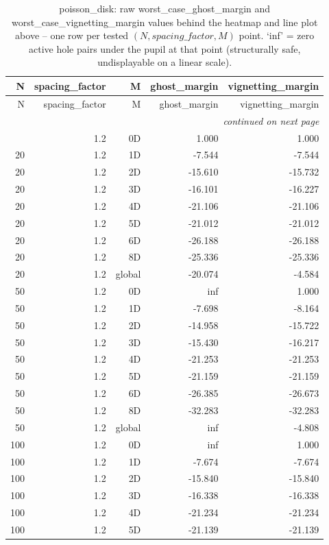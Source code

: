 \begin{longtable}{rrrrr}
\caption{poisson\_disk: raw worst\_case\_ghost\_margin and worst\_case\_vignetting\_margin values behind the heatmap and line plot above -- one row per tested $(N, spacing\_factor, M)$ point. `inf' = zero active hole pairs under the pupil at that point (structurally safe, undisplayable on a linear scale).} \\
\toprule
N & spacing\_factor & M & ghost\_margin & vignetting\_margin \\
\midrule
\endfirsthead
\toprule
N & spacing\_factor & M & ghost\_margin & vignetting\_margin \\
\midrule
\endhead
\midrule
\multicolumn{5}{r}{\itshape continued on next page} \\
\endfoot
\bottomrule
\endlastfoot
20 & 1.2 & 0D & 1.000 & 1.000 \\
20 & 1.2 & 1D & -7.544 & -7.544 \\
20 & 1.2 & 2D & -15.610 & -15.732 \\
20 & 1.2 & 3D & -16.101 & -16.227 \\
20 & 1.2 & 4D & -21.106 & -21.106 \\
20 & 1.2 & 5D & -21.012 & -21.012 \\
20 & 1.2 & 6D & -26.188 & -26.188 \\
20 & 1.2 & 8D & -25.336 & -25.336 \\
20 & 1.2 & global & -20.074 & -4.584 \\
50 & 1.2 & 0D & inf & 1.000 \\
50 & 1.2 & 1D & -7.698 & -8.164 \\
50 & 1.2 & 2D & -14.958 & -15.722 \\
50 & 1.2 & 3D & -15.430 & -16.217 \\
50 & 1.2 & 4D & -21.253 & -21.253 \\
50 & 1.2 & 5D & -21.159 & -21.159 \\
50 & 1.2 & 6D & -26.385 & -26.673 \\
50 & 1.2 & 8D & -32.283 & -32.283 \\
50 & 1.2 & global & inf & -4.808 \\
100 & 1.2 & 0D & inf & 1.000 \\
100 & 1.2 & 1D & -7.674 & -7.674 \\
100 & 1.2 & 2D & -15.840 & -15.840 \\
100 & 1.2 & 3D & -16.338 & -16.338 \\
100 & 1.2 & 4D & -21.234 & -21.234 \\
100 & 1.2 & 5D & -21.139 & -21.139 \\

\end{longtable}
